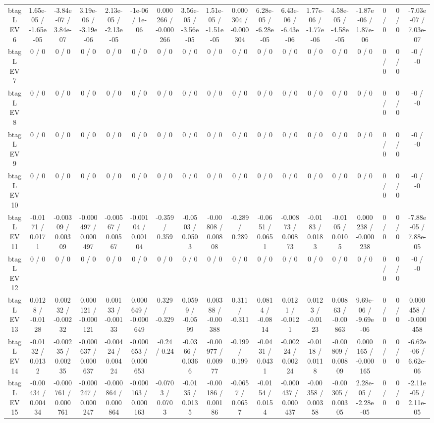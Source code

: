 \documentclass[10pt]{article}
\begin{document}
\begin{table}[htbp]
\begin{center}
\begin{tabular}{|c|c|c|c|c|c|c|c|c|c|c|c|c|c|c|c|c|c|}
  btag L EV 6 & 1.65e-05 / -1.65e-05 & -3.84e-07 / 3.84e-07 & 3.19e-06 / -3.19e-06 & 2.13e-05 / -2.13e-05 & -1e-06 / 1e-06 & 0.000266 / -0.000266 & 3.56e-05 / -3.56e-05 & 1.51e-05 / -1.51e-05 & 0.000304 / -0.000304 & 6.28e-05 / -6.28e-05 & 6.43e-06 / -6.43e-06 & 1.77e-06 / -1.77e-06 & 4.58e-05 / -4.58e-05 & -1.87e-06 / 1.87e-06 & 0 / 0 & 0 / 0 & -7.03e-07 / 7.03e-07 \\ 
  btag L EV 7 & 0 / 0 & 0 / 0 & 0 / 0 & 0 / 0 & 0 / 0 & 0 / 0 & 0 / 0 & 0 / 0 & 0 / 0 & 0 / 0 & 0 / 0 & 0 / 0 & 0 / 0 & 0 / 0 & 0 / 0 & 0 / 0 & -0 / -0 \\ 
  btag L EV 8 & 0 / 0 & 0 / 0 & 0 / 0 & 0 / 0 & 0 / 0 & 0 / 0 & 0 / 0 & 0 / 0 & 0 / 0 & 0 / 0 & 0 / 0 & 0 / 0 & 0 / 0 & 0 / 0 & 0 / 0 & 0 / 0 & -0 / -0 \\ 
  btag L EV 9 & 0 / 0 & 0 / 0 & 0 / 0 & 0 / 0 & 0 / 0 & 0 / 0 & 0 / 0 & 0 / 0 & 0 / 0 & 0 / 0 & 0 / 0 & 0 / 0 & 0 / 0 & 0 / 0 & 0 / 0 & 0 / 0 & -0 / -0 \\ 
  btag L EV 10 & 0 / 0 & 0 / 0 & 0 / 0 & 0 / 0 & 0 / 0 & 0 / 0 & 0 / 0 & 0 / 0 & 0 / 0 & 0 / 0 & 0 / 0 & 0 / 0 & 0 / 0 & 0 / 0 & 0 / 0 & 0 / 0 & -0 / -0 \\ 
  btag L EV 11 & -0.0171 / 0.0171 & -0.00309 / 0.00309 & -0.000497 / 0.000497 & -0.00567 / 0.00567 & -0.00104 / 0.00104 & -0.359 / 0.359 & -0.0503 / 0.0503 & -0.00808 / 0.00808 & -0.289 / 0.289 & -0.0651 / 0.0651 & -0.00873 / 0.00873 & -0.0183 / 0.0183 & -0.0105 / 0.0105 & 0.000238 / -0.000238 & 0 / 0 & 0 / 0 & -7.88e-05 / 7.88e-05 \\ 
  btag L EV 12 & 0 / 0 & 0 / 0 & 0 / 0 & 0 / 0 & 0 / 0 & 0 / 0 & 0 / 0 & 0 / 0 & 0 / 0 & 0 / 0 & 0 / 0 & 0 / 0 & 0 / 0 & 0 / 0 & 0 / 0 & 0 / 0 & -0 / -0 \\ 
  btag L EV 13 & 0.0128 / -0.0128 & 0.00232 / -0.00232 & 0.000121 / -0.000121 & 0.00133 / -0.00133 & 0.000649 / -0.000649 & 0.329 / -0.329 & 0.0599 / -0.0599 & 0.00388 / -0.00388 & 0.311 / -0.311 & 0.0814 / -0.0814 & 0.0121 / -0.0121 & 0.0123 / -0.0123 & 0.00863 / -0.00863 & 9.69e-06 / -9.69e-06 & 0 / 0 & 0 / 0 & 0.000458 / -0.000458 \\ 
  btag L EV 14 & -0.0132 / 0.0132 & -0.00235 / 0.00235 & -0.000637 / 0.000637 & -0.00424 / 0.00424 & -0.000653 / 0.000653 & -0.24 / 0.24 & -0.0366 / 0.0366 & -0.00977 / 0.00977 & -0.199 / 0.199 & -0.0431 / 0.0431 & -0.00224 / 0.00224 & -0.0118 / 0.0118 & -0.00809 / 0.00809 & 0.000165 / -0.000165 & 0 / 0 & 0 / 0 & -6.62e-06 / 6.62e-06 \\ 
  btag L EV 15 & -0.00434 / 0.00434 & -0.000761 / 0.000761 & -0.000247 / 0.000247 & -0.000864 / 0.000864 & -0.000163 / 0.000163 & -0.0703 / 0.0703 & -0.0135 / 0.0135 & -0.00186 / 0.00186 & -0.0657 / 0.0657 & -0.0154 / 0.0154 & -0.000437 / 0.000437 & -0.00358 / 0.00358 & -0.00305 / 0.00305 & 2.28e-05 / -2.28e-05 & 0 / 0 & 0 / 0 & -2.11e-05 / 2.11e-05 \\ 

\end{tabular}
\end{center}
\end{table}
\end{document}

